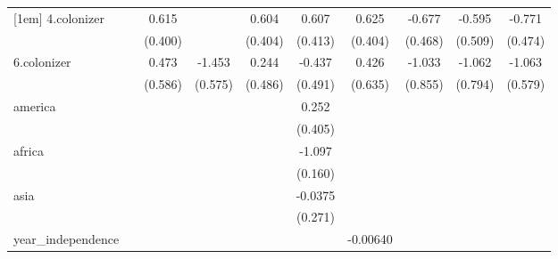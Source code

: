 {\begin{tabular}{l*{9}{c}}
[1em]
4.colonizer &                     &       0.615         &                     &       0.604         &       0.607         &       0.625         &      -0.677         &      -0.595         &      -0.771         \\
            &                     &     (0.400)         &                     &     (0.404)         &     (0.413)         &     (0.404)         &     (0.468)         &     (0.509)         &     (0.474)         \\
[1em]
6.colonizer &                     &       0.473         &      -1.453\sym{**} &       0.244         &      -0.437         &       0.426         &      -1.033         &      -1.062         &      -1.063\sym{*}  \\
            &                     &     (0.586)         &     (0.575)         &     (0.486)         &     (0.491)         &     (0.635)         &     (0.855)         &     (0.794)         &     (0.579)         \\
[1em]
america     &                     &                     &                     &                     &       0.252         &                     &                     &                     &                     \\
            &                     &                     &                     &                     &     (0.405)         &                     &                     &                     &                     \\
[1em]
africa      &                     &                     &                     &                     &      -1.097\sym{***}&                     &                     &                     &                     \\
            &                     &                     &                     &                     &     (0.160)         &                     &                     &                     &                     \\
[1em]
asia        &                     &                     &                     &                     &     -0.0375         &                     &                     &                     &                     \\
            &                     &                     &                     &                     &     (0.271)         &                     &                     &                     &                     \\
[1em]
year\_independence&                     &                     &                     &                     &                     &    -0.00640         &                     &                     &                     \\

\end{tabular}}
